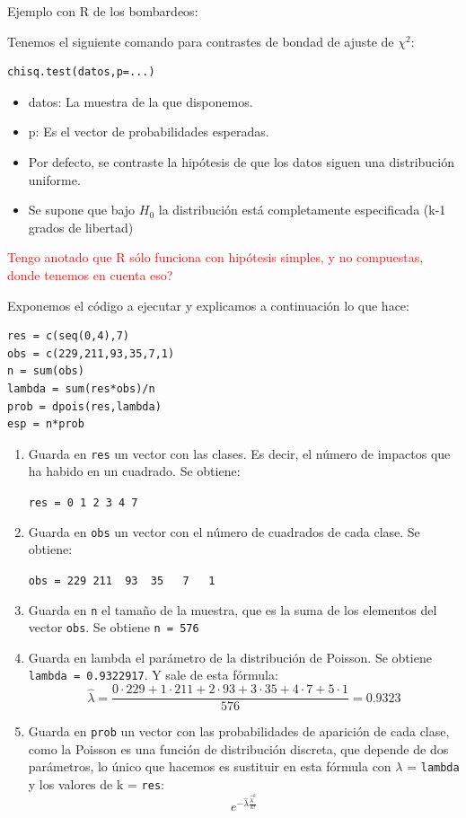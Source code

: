 \documentclass[nochap]{apuntes}
\begin{document}
\begin{example}
Ejemplo con R de los bombardeos:

Tenemos el siguiente comando para contrastes de bondad de ajuste de $\chi^2$:
\begin{verbatim}
chisq.test(datos,p=...)
\end{verbatim}

\begin{itemize}
\item datos: La muestra de la que disponemos.
\item p: Es el vector de probabilidades esperadas.
\item Por defecto, se contraste la hipótesis de que los datos siguen una distribución uniforme.
\item Se supone que bajo $H_0$ la distribución está completamente especificada (k-1 grados de libertad)
\end{itemize}
\textcolor{red}{Tengo anotado que R sólo funciona con hipótesis simples, y no compuestas, donde tenemos en cuenta eso?}

Exponemos el código a ejecutar y explicamos a continuación lo que hace:

\begin{verbatim}
res = c(seq(0,4),7)
obs = c(229,211,93,35,7,1)
n = sum(obs)
lambda = sum(res*obs)/n
prob = dpois(res,lambda)
esp = n*prob
\end{verbatim}

\begin{enumerate}
\item Guarda en \verb|res| un vector con las clases. Es decir, el número de impactos que ha habido en un cuadrado. Se obtiene:

\verb|res = 0 1 2 3 4 7|

\item Guarda en \verb|obs| un vector con el número de cuadrados de cada clase. Se obtiene:

\verb|obs = 229 211  93  35   7   1|

\item Guarda en \verb|n| el tamaño de la muestra, que es la suma de los elementos del vector \verb|obs|. Se obtiene \verb|n = 576|
\item Guarda en lambda el parámetro de la distribución de Poisson. Se obtiene \verb|lambda = 0.9322917|. Y sale de esta fórmula:
$$ \hat{\lambda} = \frac{0\cdot229 + 1\cdot211+2\cdot93+3\cdot35+4\cdot7+5\cdot1}{576}=0.9323$$
\item Guarda en \verb|prob| un vector con las probabilidades de aparición de cada clase, como la Poisson es una función de distribución discreta, que depende de dos parámetros, lo único que hacemos es sustituir en esta fórmula con $\lambda$ = \verb|lambda| y los valores de k = \verb|res|:
$$e^{-\hat{\lambda}\frac{\hat{\lambda}^k}{k!}}$$


\end{enumerate}
\end{example}
\end{document}
